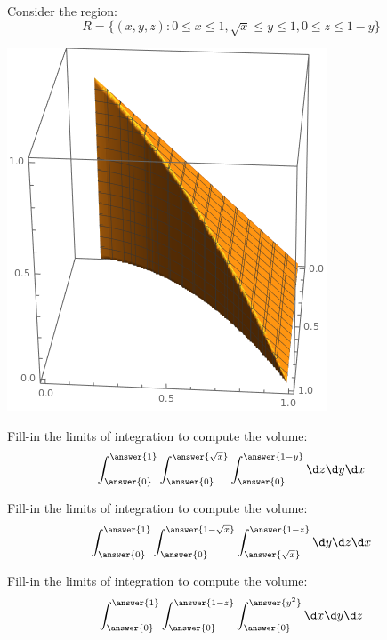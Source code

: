 \documentclass{ximera}
\author{Bart Snapp}
\begin{document}
Consider the region:
\[
R = \{(x,y,z): 0\le x \le 1, \sqrt{x}\le y\le 1, 0 \le z \le 1-y\}
\]
\begin{image}[2in]
  \includegraphics{3DRectRegion.png}
\end{image}

\begin{problem}
  Fill-in the limits of integration to compute the volume:
  \[
  \int_{\answer{0}}^{\answer{1}}\int_{\answer{0}}^{\answer{\sqrt{x}}}\int_{\answer{0}}^{\answer{1-y}}\d z \d y \d x
  \]
\end{problem}



\begin{problem}
  Fill-in the limits of integration to compute the volume:
  \[
  \int_{\answer{0}}^{\answer{1}}\int_{\answer{0}}^{\answer{1-\sqrt{x}}}\int_{\answer{\sqrt{x}}}^{\answer{1-z}}\d y \d z \d x
  \]
\end{problem}

\begin{problem}
  Fill-in the limits of integration to compute the volume:
  \[
  \int_{\answer{0}}^{\answer{1}}\int_{\answer{0}}^{\answer{1-z}}\int_{\answer{0}}^{\answer{y^2}}\d x \d y \d z
  \]
\end{problem}
\end{document}
